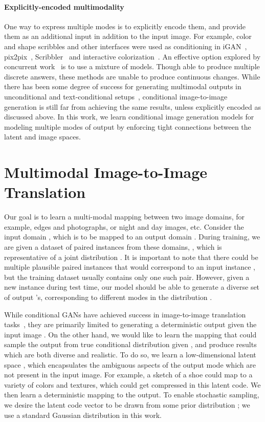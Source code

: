 \documentclass{article}
\begin{document}
\paragraph{Explicitly-encoded multimodality}
One way to express multiple modes is to explicitly encode them, and provide them as an additional input in addition to the input image.
For example, color and shape scribbles and other interfaces were used as conditioning in iGAN~\citep{zhu2016generative}, pix2pix~\citep{isola2016image}, Scribbler~\citep{sangkloy2017scribbler} and interactive colorization~\citep{zhang2017real}. An effective option explored by concurrent work~\citep{ghosh2017multi, chen2017photographic,bansal2017pixelnn} is to use a mixture of models. Though able to produce multiple discrete answers, these methods are unable to produce continuous changes.
While there has been some degree of success for generating multimodal outputs in unconditional and text-conditional setups~\citep{goodfellow2014generative,nguyen2016plug,reed2016generative,dinh2016density,larsen2016vaegan}, conditional image-to-image generation is still far from achieving the same results, unless explicitly encoded as discussed above. 
In this work, we learn conditional image generation models for modeling multiple modes of output by enforcing tight connections between the latent and image spaces.
 
\section{Multimodal Image-to-Image Translation}
\label{sec:methods}
Our goal is to learn a multi-modal mapping between two image domains, for example, edges and photographs, or night and day images, etc. 
Consider the input domain , which is to be mapped to an output domain . 
During training, we are given a dataset of paired instances from these domains, , which is representative of a joint distribution .
It is important to note that there could be multiple plausible paired instances  that would correspond to an input instance , but the training dataset usually contains only one such pair.
However, given a new instance  during test time, our model should be able to generate a diverse set of output 's, corresponding to different modes in the distribution .

While conditional GANs have achieved success in image-to-image translation tasks~\citep{pathakCVPR16context,sangkloy2017scribbler,xian2017texturegan,yang2016high,isola2016image,zhu2017unpaired}, they are primarily limited to generating a deterministic output  given the input image . 
On the other hand, we would like to learn the mapping that could sample the output  from true conditional distribution given , and produce results which are both diverse and realistic.
To do so, we learn a low-dimensional latent space , which encapsulates the ambiguous aspects of the output mode which are not present in the input image. For example, a sketch of a shoe could map to a variety of colors and textures, which could get compressed in this latent code. We then learn a deterministic mapping  to the output. To enable stochastic sampling, we desire the latent code vector  to be drawn from some prior distribution ; we use a standard Gaussian distribution  in this work.
\end{document}
